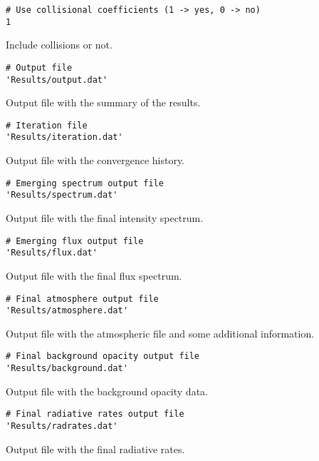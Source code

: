\documentclass[12pt]{article}
\begin{document}
\begin{footnotesize} \begin{verbatim}
# Use collisional coefficients (1 -> yes, 0 -> no)
1
\end{verbatim} \end{footnotesize}
Include collisions or not.

\begin{footnotesize} \begin{verbatim}
# Output file
'Results/output.dat'
\end{verbatim} \end{footnotesize}
Output file with the summary of the results.

\begin{footnotesize} \begin{verbatim}
# Iteration file
'Results/iteration.dat'
\end{verbatim} \end{footnotesize}
Output file with the convergence history.

\begin{footnotesize} \begin{verbatim}
# Emerging spectrum output file
'Results/spectrum.dat'
\end{verbatim} \end{footnotesize}
Output file with the final intensity spectrum.

\begin{footnotesize} \begin{verbatim}
# Emerging flux output file
'Results/flux.dat'
\end{verbatim} \end{footnotesize}
Output file with the final flux spectrum.

\begin{footnotesize} \begin{verbatim}
# Final atmosphere output file
'Results/atmosphere.dat'
\end{verbatim} \end{footnotesize}
Output file with the atmospheric file and some additional information.

\begin{footnotesize} \begin{verbatim}
# Final background opacity output file
'Results/background.dat'
\end{verbatim} \end{footnotesize}
Output file with the background opacity data.

\begin{footnotesize} \begin{verbatim}
# Final radiative rates output file
'Results/radrates.dat'
\end{verbatim} \end{footnotesize}
Output file with the final radiative rates.
\end{document}
